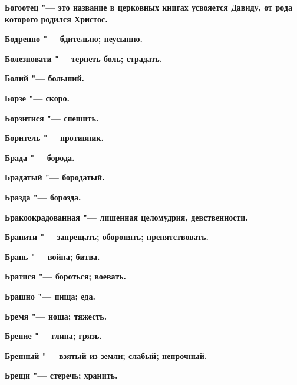 \begin{mymulticols}{2}
\bfseries Богоотец\normalfont{} "--- это название в церковных книгах усвояется Давиду, от рода которого родился Христос. 




\bfseries Бодренно\normalfont{} "--- бдительно; неусыпно. 




\bfseries Болезновати\normalfont{} "--- терпеть боль; страдать. 




\bfseries Болий\normalfont{} "--- больший. 




\bfseries Борзе\normalfont{} "--- скоро. 




\bfseries Борзитися\normalfont{} "--- спешить. 




\bfseries Боритель\normalfont{} "--- противник. 




\bfseries Брада\normalfont{} "--- борода. 




\bfseries Брадатый\normalfont{} "--- бородатый. 




\bfseries Бразда\normalfont{} "--- борозда. 




\bfseries Бракоокрадованная\normalfont{} "--- лишенная целомудрия, девственности. 




\bfseries Бранити\normalfont{} "--- запрещать; оборонять; препятствовать. 




\bfseries Брань\normalfont{} "--- война; битва. 




\bfseries Братися\normalfont{} "--- бороться; воевать. 




\bfseries Брашно\normalfont{} "--- пища; еда. 




\bfseries Бремя\normalfont{} "--- ноша; тяжесть. 




\bfseries Брение\normalfont{} "--- глина; грязь. 




\bfseries Бренный\normalfont{} "--- взятый из земли; слабый; непрочный. 




\bfseries Брещи\normalfont{} "--- стеречь; хранить. 





\end{mymulticols}
